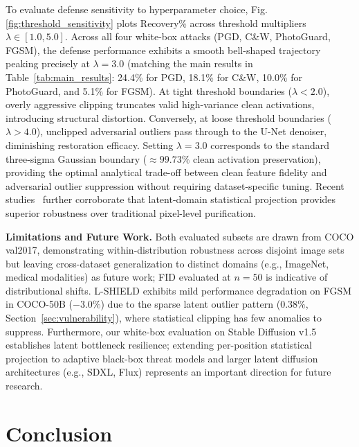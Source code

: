 \documentclass[conference]{IEEEtran}
\begin{document}
To evaluate defense sensitivity to hyperparameter choice, Fig.\,\ref{fig:threshold_sensitivity} plots Recovery\% across threshold multipliers $\lambda \in [1.0, 5.0]$. Across all four white-box attacks (PGD, C\&W, PhotoGuard, FGSM), the defense performance exhibits a smooth bell-shaped trajectory peaking precisely at $\lambda = 3.0$ (matching the main results in Table~\ref{tab:main_results}: 24.4\% for PGD, 18.1\% for C\&W, 10.0\% for PhotoGuard, and 5.1\% for FGSM). At tight threshold boundaries ($\lambda < 2.0$), overly aggressive clipping truncates valid high-variance clean activations, introducing structural distortion. Conversely, at loose threshold boundaries ($\lambda > 4.0$), unclipped adversarial outliers pass through to the U-Net denoiser, diminishing restoration efficacy. Setting $\lambda = 3.0$ corresponds to the standard three-sigma Gaussian boundary ($\approx 99.73\%$ clean activation preservation), providing the optimal analytical trade-off between clean feature fidelity and adversarial outlier suppression without requiring dataset-specific tuning. Recent studies~\cite{zheng2024latentguard,huang2024safelatent,wang2025advpurify,yang2024robustlatent} further corroborate that latent-domain statistical projection provides superior robustness over traditional pixel-level purification.


\textbf{Limitations and Future Work.}
Both evaluated subsets are drawn from COCO val2017, demonstrating within-distribution robustness
across disjoint image sets but leaving cross-dataset generalization to distinct domains (e.g., ImageNet, medical modalities) as future work; FID evaluated at $n{=}50$ is indicative of distributional shifts.
L-SHIELD exhibits mild performance degradation on FGSM in COCO-50B ($-3.0\%$) due to the sparse latent
outlier pattern ($0.38\%$, Section~\ref{sec:vulnerability}), where statistical clipping has few anomalies to suppress. Furthermore, our white-box evaluation on Stable Diffusion v1.5 establishes latent bottleneck resilience; extending per-position statistical projection to adaptive black-box threat models and larger latent diffusion architectures (e.g., SDXL, Flux) represents an important direction for future research.

\enlargethispage{25pt}
\section{Conclusion}
\end{document}
